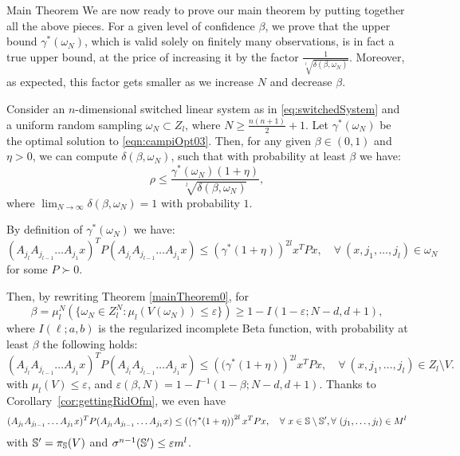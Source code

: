 \begin{subsection}{Main Theorem}
We are now ready to prove our main theorem by putting together all the above pieces. For a given level of confidence $\beta$, we prove that the upper bound $\gamma^{*}(\omega_N)$, which is valid solely on finitely many observations, is in fact a true upper bound, at the price of increasing it by the factor $\frac{1}{\sqrt[l]{\delta(\beta, \omega_N)}}$. Moreover, as expected, this factor gets smaller as we increase $N$ and decrease $\beta$.


\begin{thm}\label{thm:mainTheorem}
Consider an $n$-dimensional switched linear system as in \eqref{eq:switchedSystem} and a uniform random sampling $\omega_N \subset Z_l$, where $N \geq \frac{n(n+1)}{2}+1$. Let $\gamma^{*}(\omega_N) $ be the optimal solution to \eqref{eqn:campiOpt03}. Then, for any given $\beta \in (0,1)$ and $\eta > 0$, we can compute $\delta(\beta, \omega_N)$, such that with probability at least $\beta$ we have:
$$\rho \leq \frac{\gamma^{*}(\omega_N) (1+ \eta)}{\sqrt[l]{\delta(\beta, \omega_N)}},$$
where $\lim_{N \to \infty}\delta(\beta, \omega_N) = 1$ with probability $1$.
\end{thm}


\begin{pf}

By definition of $\gamma^{*}(\omega_N)$ we have:
\begin{equation*} 
(A_{j_l} A_{j_{l-1}} \dots A_{j_1} x)^T P (A_{j_l} A_{j_{l-1}} \dots A_{j_1} x) \leq (\gamma^{*}(1+\eta))^{2l} x^T P x, \quad \forall\ (x, j_1, \dots, j_l)  \in \omega_N 
\end{equation*}
for some $P \succ 0$. 

Then, by rewriting Theorem \ref{mainTheorem0}, for
\begin{equation}\label{eqn:violation2}
\beta = \mu_l^N \left( \{ \omega_N \in Z_l^N: \mu_l(V(\omega_N)) \leq \varepsilon \} \right) \geq 1- I(1-\varepsilon; N-d, d+1),
\end{equation}
where $I(\ell;a,b)$ is the regularized incomplete Beta function, with probability at least $\beta$ the following holds:
\begin{equation*} 
(A_{j_l} A_{j_{l-1}} \dots A_{j_1} x)^T P (A_{j_l} A_{j_{l-1}} \dots A_{j_1} x) \leq  \left((\gamma^{*}(1+\eta) \right)^{2l} x^T P x, \quad \forall\ (x, j_1, \dots, j_l) \in Z_l \setminus V.
\end{equation*}
with $\mu_l(V) \leq \varepsilon$, and $\varepsilon(\beta, N)=1- I^{-1}(1-\beta; N-d, d+1)$. Thanks to Corollary~\ref{cor:gettingRidOfm}, we even have
\begin{equation*} 
(A_{j_l} A_{j_{l-1}} \dots A_{j_1} x)^T P (A_{j_l} A_{j_{l-1}} \dots A_{j_1} x) \leq  \left((\gamma^{*}(1+\eta) \right)^{2l} x^T P x, \quad \forall\ x \in \mathbb{S} \setminus \mathbb{S}', \forall\ (j_1, \dots, j_l) \in M^l
\end{equation*}
with $\mathbb{S}' = \pi_{\mathbb{S}}(V)$ and $\sigma^{n-1}(\mathbb{S}') \leq \varepsilon m^l$.


\end{pf}
\end{subsection}
